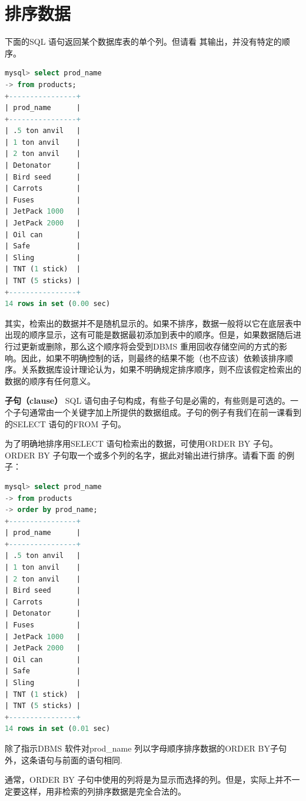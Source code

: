 \documentclass[11pt,a4paper,oneside]{book}
\begin{document}
\section{排序数据}
下面的SQL 语句返回某个数据库表的单个列。但请看
其输出，并没有特定的顺序。
\begin{lstlisting}[language=sql]
mysql> select prod_name
-> from products;
+----------------+
| prod_name      |
+----------------+
| .5 ton anvil   |
| 1 ton anvil    |
| 2 ton anvil    |
| Detonator      |
| Bird seed      |
| Carrots        |
| Fuses          |
| JetPack 1000   |
| JetPack 2000   |
| Oil can        |
| Safe           |
| Sling          |
| TNT (1 stick)  |
| TNT (5 sticks) |
+----------------+
14 rows in set (0.00 sec)
\end{lstlisting}
其实，检索出的数据并不是随机显示的。如果不排序，数据一般将以它在底层表中出现的顺序显示，这有可能是数据最初添加到表中的顺序。但是，如果数据随后进行过更新或删除，那么这个顺序将会受到DBMS 重用回收存储空间的方式的影响。因此，如果不明确控制的话，则最终的结果不能（也不应该）依赖该排序顺序。关系数据库设计理论认为，如果不明确规定排序顺序，则不应该假定检索出的数据的顺序有任何意义。

\begin{tcolorbox}[colback=pink!10!white,colframe=pink!100!black]
\textbf{子句（clause）}
SQL 语句由子句构成，有些子句是必需的，有些则是可选的。一个子句通常由一个关键字加上所提供的数据组成。子句的例子有我们在前一课看到的SELECT 语句的FROM 子句。
\end{tcolorbox}

为了明确地排序用SELECT 语句检索出的数据，可使用ORDER BY 子句。
ORDER BY 子句取一个或多个列的名字，据此对输出进行排序。请看下面
的例子：

\begin{lstlisting}[language=sql]
mysql> select prod_name
-> from products
-> order by prod_name;
+----------------+
| prod_name      |
+----------------+
| .5 ton anvil   |
| 1 ton anvil    |
| 2 ton anvil    |
| Bird seed      |
| Carrots        |
| Detonator      |
| Fuses          |
| JetPack 1000   |
| JetPack 2000   |
| Oil can        |
| Safe           |
| Sling          |
| TNT (1 stick)  |
| TNT (5 sticks) |
+----------------+
14 rows in set (0.01 sec)
\end{lstlisting}
除了指示DBMS 软件对prod\_name 列以字母顺序排序数据的ORDER BY子句外，这条语句与前面的语句相同.

通常，ORDER BY 子句中使用的列将是为显示而选择的列。但是，实际上并不一定要这样，用非检索的列排序数据是完全合法的。
\end{document}

